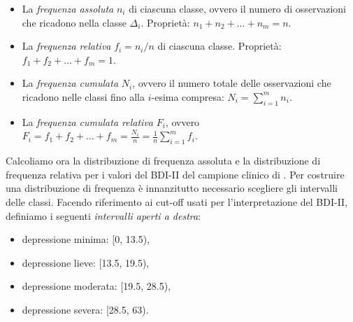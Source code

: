 \documentclass[
  10pt,
  italian,
  a4paper,
  extrafontsizes,onecolumn,openright
  ]{memoir}
\providecommand{\tightlist}{%
  \setlength{\itemsep}{0pt}\setlength{\parskip}{0pt}}
\theoremstyle{definition}
\theoremstyle{definition}
\theoremstyle{definition}
\theoremstyle{definition}
\theoremstyle{remark}
\begin{document}
\begin{itemize}
\item
  La \emph{frequenza assoluta} \(n_i\) di ciascuna classe, ovvero il numero di osservazioni che ricadono nella classe \(\Delta_i\).
  Proprietà: \(n_1 + n_2 + \dots + n_m = n\).
\item
  La \emph{frequenza relativa} \(f_i = n_i/n\) di ciascuna classe. Proprietà: \(f_1+f_2+\dots+f_m =1\).
\item
  La \emph{frequenza cumulata} \(N_i\), ovvero il numero totale delle osservazioni che ricadono nelle classi fino alla \(i\)-esima compresa: \(N_i = \sum_{i=1}^m n_i.\)
\item
  La \emph{frequenza cumulata relativa} \(F_i\), ovvero
  \(F_i = f_1+f_2+\dots+f_m = \frac{N_i}{n} = \frac{1}{n} \sum_{i=1}^m f_i.\)
\end{itemize}

Calcoliamo ora la distribuzione di frequenza assoluta e la distribuzione di frequenza relativa per i valori del BDI-II del campione clinico di \textcite{zetschefuture2019}. Per costruire una distribuzione di frequenza è innanzitutto necessario scegliere gli intervalli delle classi. Facendo riferimento ai cut-off usati per l'interpretazione del BDI-II, definiamo i seguenti \emph{intervalli aperti a destra}:

\begin{itemize}
\tightlist
\item
  depressione minima: {[}0, 13.5),
\item
  depressione lieve: {[}13.5, 19.5),
\item
  depressione moderata: {[}19.5, 28.5),
\item
  depressione severa: {[}28.5, 63).
\end{itemize}
\end{document}
